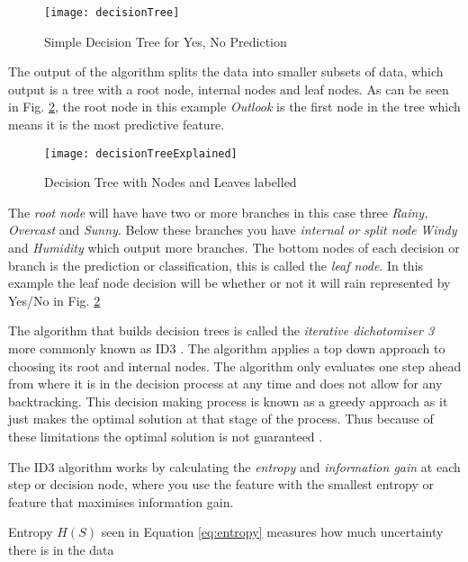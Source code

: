 \begin{figure}[H]
	\texttt{[image: decisionTree]}
	\caption{Simple Decision Tree for Yes, No Prediction \\ \cite[Source:][]{quinlan_induction_1986}}
	\label{fig:decisionTree}
\end{figure}

The output of the algorithm splits the data into smaller subsets of data, which output is a tree with a root node, internal nodes and leaf nodes. As can be seen in Fig. \ref{fig:decisionTreeExplained}, the root node in this example \textit{Outlook} is the first node in the tree which means it is the most predictive feature. 

\begin{figure}[H]
	\texttt{[image: decisionTreeExplained]}
	\caption{Decision Tree with Nodes and Leaves labelled}
	\label{fig:decisionTreeExplained}
\end{figure}

The \textit{root node} will have have two or more branches in this case three \textit{Rainy, Overcast} and \textit{Sunny}. Below these branches you have \textit{internal or split node} \textit{Windy} and \textit{Humidity} which output more branches. The bottom nodes of each decision or branch is the prediction or classification, this is called the \textit{leaf node}. In this example the leaf node decision will be whether or not it will rain represented by Yes/No in Fig. \ref{fig:decisionTreeExplained}

The algorithm that builds decision trees is called the \textit{iterative dichotomiser 3} more commonly known as ID3 \citep{quinlan_induction_1986}. The algorithm applies a top down approach to choosing its root and internal nodes. The algorithm only evaluates one step ahead from where it is in the decision process at any time and does not allow for any backtracking. This decision making process is known as a greedy approach as it just makes the optimal solution at that stage of the process. Thus because of these limitations the optimal solution is not guaranteed \citep{friedman_lazy_1996}.

The ID3 algorithm works by calculating the \textit{entropy} and \textit{information gain} at each step or decision node, where you use the feature with the smallest entropy or feature that maximises information gain.

Entropy $H(S)$ seen in Equation \ref{eq:entropy} measures how much uncertainty there is in the data \citep{shannon_mathematical_2001}

